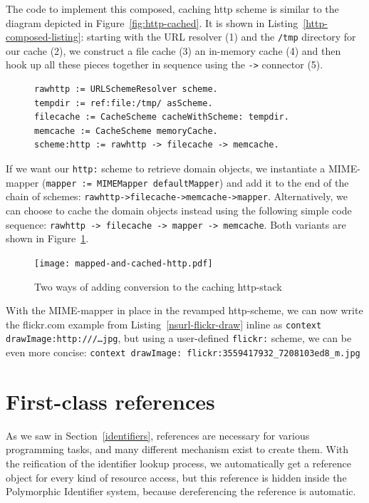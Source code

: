 \documentclass{acm_proc_article-sp}
\begin{document}
The code to implement this composed, caching http scheme is similar 
to the diagram depicted in Figure~\ref{fig:http-cached}.  It is shown in Listing~\ref{http-composed-listing}:  
starting with the URL resolver (1) and the {\tt /tmp} directory for our cache (2), we construct
a file cache (3) an in-memory cache (4) and then hook up all these pieces together
in sequence using the {\tt ->} connector (5).

\begin{figure}[htbp]
\begin{lstlisting}[style=numbers,label=http-composed-listing,caption=Code for caching http stack.]
rawhttp := URLSchemeResolver scheme.
tempdir := ref:file:/tmp/ asScheme.
filecache := CacheScheme cacheWithScheme: tempdir.
memcache := CacheScheme memoryCache.
scheme:http := rawhttp -> filecache -> memcache.
\end{lstlisting}
\end{figure}

If we want our {\tt http:} scheme to retrieve domain objects, we instantiate a MIME-mapper
({\tt mapper := MIMEMapper defaultMapper}) and add it to the end of the chain of schemes: 
{\tt rawhttp->filecache->memcache->mapper}.  Alternatively, we can choose to cache the
domain objects instead using the following simple code sequence: {\tt rawhttp -> filecache -> mapper -> memcache}.
Both variants are shown in Figure~\ref{http-cached-converted}.


\begin{figure}[htbp]
\centering
\texttt{[image: mapped-and-cached-http.pdf]}
\caption{Two ways of adding conversion to the caching http-stack}
\label{http-cached-converted}
\end{figure}


With the MIME-mapper in place in the revamped http-scheme, we can now 
write the flickr.com example from Listing~\ref{nsurl-flickr-draw} inline as {\tt context drawImage:http:///{\ldots}jpg},
but using a user-defined {\tt flickr:} scheme, we can be even more concise:  
{\tt context drawImage: flickr:3559417932\_7208103ed8\_m.jpg}


\section{First-class references}
\label{references}

As we saw in Section~\ref{identifiers}, references are necessary for various programming tasks,
and many different mechanism exist to create them.   With the reification of the identifier lookup
process, we automatically get a reference object for every kind of resource access, but this
reference is hidden inside the Polymorphic Identifier system, because dereferencing the
reference is automatic.
\end{document}

